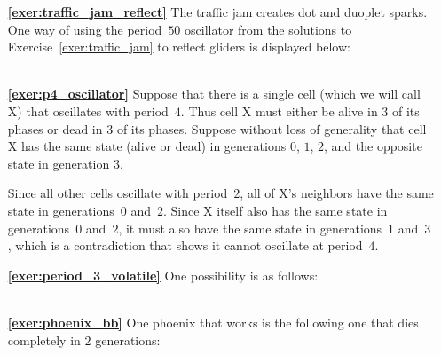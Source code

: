 \begin{multicols}{2}
\begin{itemize}[leftmargin=0em]
	 \\


	\item[\bf\color{ocre}\sffamily\ref{exer:traffic_jam_reflect}] The traffic jam creates dot and duoplet sparks. One way of using the period~$50$ oscillator from the solutions to Exercise~\ref{exer:traffic_jam} to reflect gliders is displayed below: \\[-0.6em]
	
	 \\
	
	
	\item[\bf\color{ocre}\sffamily\ref{exer:p4_oscillator}] Suppose that there is a single cell (which we will call X) that oscillates with period~$4$. Thus cell X must either be alive in $3$ of its phases or dead in $3$ of its phases. Suppose without loss of generality that cell X has the same state (alive or dead) in generations $0$, $1$, $2$, and the opposite state in generation $3$.
	
	Since all other cells oscillate with period~$2$, all of X's neighbors have the same state in generations~$0$ and~$2$. Since X itself also has the same state in generations~$0$ and~$2$, it must also have the same state in generations~$1$ and~$3$, which is a contradiction that shows it cannot oscillate at period~$4$. \\
	
	
	\item[\bf\color{ocre}\sffamily\ref{exer:period_3_volatile}] One possibility is as follows: \\[-0.6em]
	
	 \\
	
	
	\item[\bf\color{ocre}\sffamily\ref{exer:phoenix_bb}] One phoenix that works is the following one that dies completely in $2$ generations: \\[-0.6em]
	
	 \\
\end{itemize}
\end{multicols}


\hypertarget{solutions_spaceships}{}\label{solutions_spaceships}

